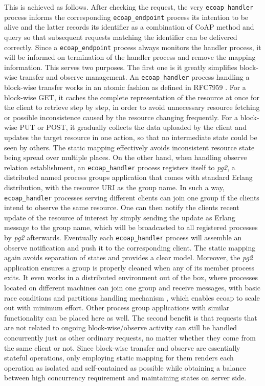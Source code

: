 This is achieved as follows. After checking the request, the very \verb|ecoap_handler| process informs the corresponding \verb|ecoap_endpoint| process its intention to be alive and the latter records its identifier as a combination of CoAP method and query so that subsequent requests matching the identifier can be delivered correctly. Since a \verb|ecoap_endpoint| process always monitors the handler process, it will be informed on termination of the handler process and remove the mapping information. This serves two purposes. The first one is it greatly simplifies block-wise transfer and observe management. An \verb|ecoap_handler| process handling a block-wise transfer works in an atomic fashion as defined in RFC7959 \cite{blockwise}. For a block-wise GET, it caches the complete representation of the resource at once for the client to retrieve step by step, in order to avoid unnecessary resource fetching or possible inconsistence caused by the resource changing frequently. For a block-wise PUT or POST,  it gradually collects the data uploaded by the client and updates the target resource in one action, so that no intermediate state could be seen by others. The static mapping effectively avoids inconsistent resource state being spread over multiple places. On the other hand, when handling observe relation establishment, an \verb|ecoap_handler| process registers itself to \textit{pg2}, a distributed named process groups application that comes with standard Erlang distribution, with the resource URI as the group name. In such a way, \verb|ecoap_handler| processes serving different clients can join one group if the clients intend to observe the same resource. One can then notify the clients recent update of the resource of interest by simply sending the update as Erlang message to the group name, which will be broadcasted to all registered processes by \textit{pg2} afterwards. Eventually each \verb|ecoap_handler| process will assemble an observe notification and push it to the corresponding client. The static mapping again avoids separation of states and provides a clear model. Moreover, the \textit{pg2} application ensures a group is properly cleaned when any of its member process exits. It even works in a distributed environment out of the box, where processes located on different machines can join one group and receive messages, with basic race conditions and partitions handling mechanism \cite{pg2_failure}, which enables ecoap to scale out with minimum effort. Other process group applications with similar functionality can be placed here as well. The second benefit is that requests that are not related to ongoing block-wise/observe activity can still be handled concurrently just as other ordinary requests, no matter whether they come from the same client or not. Since block-wise transfer and observe are essentially stateful operations, only employing static mapping for them renders each operation as isolated and self-contained as possible while obtaining a balance between high concurrency requirement and maintaining states on server side.

